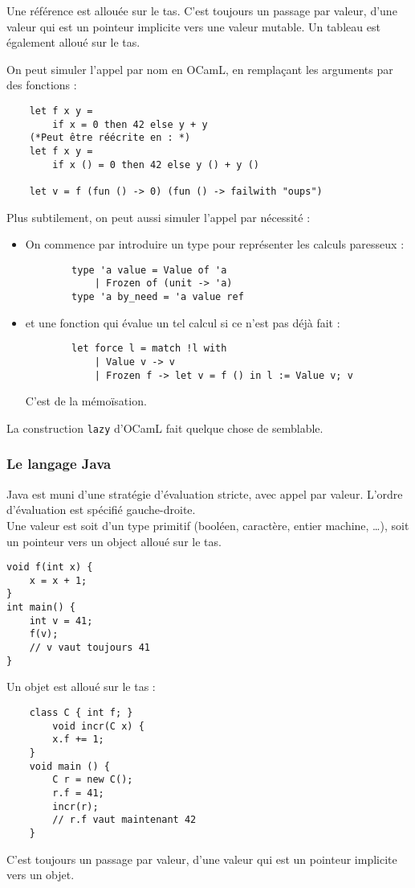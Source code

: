 \documentclass{cours}
\begin{document}
Une référence est allouée sur le tas. C'est toujours un passage par valeur, d'une valeur qui est un pointeur implicite vers une valeur mutable. Un tableau est également alloué sur le tas.

On peut simuler l'appel par nom en OCamL, en remplaçant les arguments par des fonctions : 
\begin{verbatim}
    let f x y =
        if x = 0 then 42 else y + y
    (*Peut être réécrite en : *)
    let f x y =
        if x () = 0 then 42 else y () + y ()

    let v = f (fun () -> 0) (fun () -> failwith "oups")
\end{verbatim}

Plus subtilement, on peut aussi simuler l'appel par nécessité :
\begin{itemize}
    \item On commence par introduire un type pour représenter les calculs paresseux : 
    \begin{verbatim}
        type 'a value = Value of 'a
            | Frozen of (unit -> 'a)
        type 'a by_need = 'a value ref
    \end{verbatim}
    \item et une fonction qui évalue un tel calcul si ce n'est pas déjà fait : 
    \begin{verbatim}
        let force l = match !l with
            | Value v -> v
            | Frozen f -> let v = f () in l := Value v; v
    \end{verbatim}
    C'est de la mémoïsation. 
\end{itemize}
\begin{remark}
    La construction \texttt{lazy} d'OCamL fait quelque chose de semblable. 
\end{remark}

\subsubsection{Le langage Java}
Java est muni d'une stratégie d'évaluation stricte, avec appel par valeur. L'ordre d'évaluation est spécifié gauche-droite. \\
Une valeur est soit d'un type primitif (booléen, caractère, entier machine, \dots), soit un pointeur vers un object alloué sur le tas.
\begin{verbatim}
void f(int x) {
    x = x + 1;
}
int main() {
    int v = 41;
    f(v);
    // v vaut toujours 41
}
\end{verbatim}
Un objet est alloué sur le tas : 
\begin{verbatim}
    class C { int f; }
        void incr(C x) {
        x.f += 1;
    }
    void main () {
        C r = new C();
        r.f = 41;
        incr(r);
        // r.f vaut maintenant 42
    }
\end{verbatim}
C'est toujours un passage par valeur, d'une valeur qui est un pointeur implicite vers un objet. 
\end{document}
